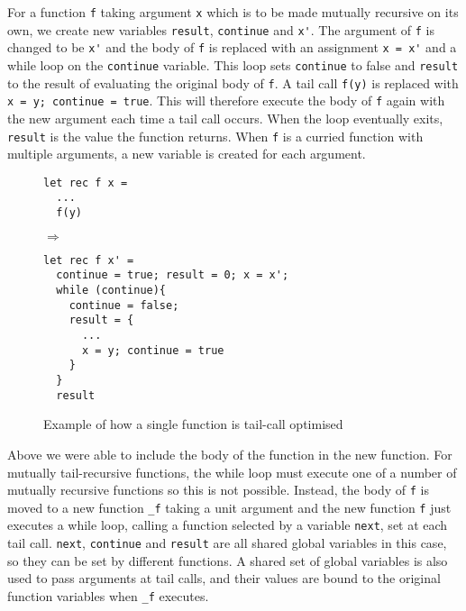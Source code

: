 For a function \verb|f| taking argument \verb|x| which is to be made mutually recursive on its own, we create new variables \verb|result|, \verb|continue| and \verb|x'|. The argument of \verb|f| is changed to be \verb|x'| and the body of \verb|f| is replaced with an assignment \verb|x = x'| and a while loop on the \verb|continue| variable. This loop sets \verb|continue| to false and \verb|result| to the result of evaluating the original body of \verb|f|. A tail call \verb|f(y)| is replaced with \verb|x = y; continue = true|. This will therefore execute the body of \verb|f| again with the new argument each time a tail call occurs. When the loop eventually exits, \verb|result| is the value the function returns. When \verb|f| is a curried function with multiple arguments, a new variable is created for each argument.

\begin{figure}[H]
\begin{minipage}{0.24\textwidth}
\begin{verbatim}
let rec f x = 
  ...
  f(y)
\end{verbatim}
\end{minipage}
 $\Longrightarrow$ \hfill
\begin{minipage}{0.6\textwidth}  %
\begin{verbatim}
let rec f x' = 
  continue = true; result = 0; x = x';
  while (continue){
    continue = false;
    result = {
      ...
      x = y; continue = true
    }
  }
  result
\end{verbatim}
\end{minipage}
\caption{Example of how a single function is tail-call optimised}
\end{figure}


Above we were able to include the body of the function in the new function. For mutually tail-recursive functions, the while loop must execute one of a number of mutually recursive functions so this is not possible. Instead, the body of \verb|f| is moved to a new function \verb|_f| taking a unit argument and the new function \verb|f| just executes a while loop, calling a function selected by a variable \verb|next|, set at each tail call. \verb|next|, \verb|continue| and \verb|result| are all shared global variables in this case, so they can be set by different functions. A shared set of global variables is also used to pass arguments at tail calls, and their values are bound to the original function variables when \verb|_f| executes.

